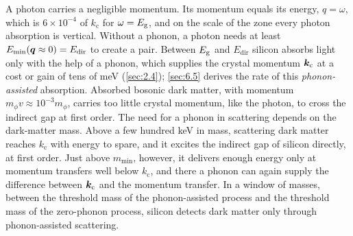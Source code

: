 A photon carries a negligible momentum. Its momentum equals its energy, $q = \omega$, which is $6\times10^{-4}$ of $k_{\mathrm{c}}$ for $\omega = E_{\mathrm{g}}$, and on the scale of the zone every photon absorption is vertical. Without a phonon, a photon needs at least $E_{\mathrm{min}}(\bm{q} \approx 0) = E_{\mathrm{dir}}$ to create a pair. Between $E_{\mathrm{g}}$ and $E_{\mathrm{dir}}$ silicon absorbs light only with the help of a phonon, which supplies the crystal momentum $\bm{k}_{\mathrm{c}}$ at a cost or gain of tens of meV (\cref{sec:2.4}); \cref{sec:6.5} derives the rate of this \emph{phonon-assisted} absorption. Absorbed bosonic dark matter, with momentum $m_\phi v \approx 10^{-3}m_\phi$, carries too little crystal momentum, like the photon, to cross the indirect gap at first order. The need for a phonon in scattering depends on the dark-matter mass. Above a few hundred keV in mass, scattering dark matter reaches $k_{\mathrm{c}}$ with energy to spare, and it excites the indirect gap of silicon directly, at first order. Just above $m_{\mathrm{min}}$, however, it delivers enough energy only at momentum transfers well below $k_{\mathrm{c}}$, and there a phonon can again supply the difference between $\bm{k}_{\mathrm{c}}$ and the momentum transfer. In a window of masses, between the threshold mass of the phonon-assisted process and the threshold mass of the zero-phonon process, silicon detects dark matter only through phonon-assisted scattering.

